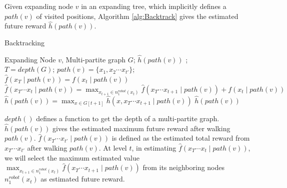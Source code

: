 \documentclass[12pt]{article}
\begin{document}
Given expanding node $ v $ in an expanding tree, which implicitly defines a $ path(v) $ of visited positions, Algorithm \ref{alg:Backtrack} gives the estimated future reward $ \hat{h}(path(v)) $.
 
\begin{algorithm}
\caption{Backtracking}
\label{alg:Backtrack}
\begin{algorithmic}
\REQUIRE
Expanding Node $ v $, Multi-partite graph $ G $;
\ENSURE $ \hat{h}(path(v)) $ ;\\
\STATE $ T = depth(G) $;
\STATE $ path(v) = \{ x_{1}, x_{2} \cdots x_{t'} \} $;
\STATE $ \hat{f}(x_{T} \mid path(v) ) = f(x_{t} \mid path(v)) $
\ELSE
\STATE $ \hat{f}(x_{T} \cdots x_{t} \mid path(v) ) = \max_{x_{t+1} \in n^{robot}_{1}(x_{t})} \hat{f}(x_{T} \cdots x_{t+1} \mid path(v) ) +  f(x_{t} \mid path(v)) $
\ENDIF
\ENDFOR
\ENDFOR
\STATE  $ \hat{h}(path(v)) = \max_{x \in G[t+1]} \hat{h}(x, x_{T} \cdots x_{t+1} \mid path(v) ) $
\RETURN $ \hat{h}(path(v))  $
\end{algorithmic}
\end{algorithm}

$ depth() $ defines a function to get the depth of a multi-partite graph. 
$ \hat{h}(path(v)) $ gives the estimated maximum future reward after walking $ path(v) $. $ \hat{f}(x_{T} \cdots x_{t'} \mid path(v) ) $ is defined as the estimated total reward from $ x_{T} \cdots x_{t'} $ after walking $ path(v) $. At level $ t $, in estimating $ \hat{f}(x_{T} \cdots x_{t} \mid path(v) ) $, we will select the maximum estimated value $ \max_{x_{t+1} \in n^{robot}_{1}(x_{t})} \hat{f}(x_{T} \cdots x_{t+1} \mid path(v) ) $ from its neighboring nodes $ n^{robot}_{1}(x_{t}) $ as estimated future reward.



\end{document}
